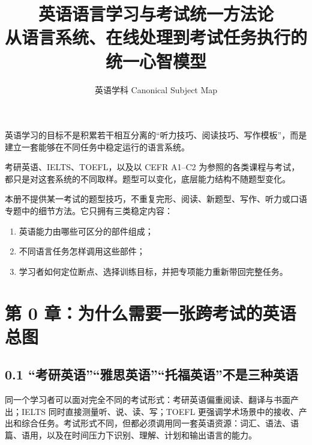 \documentclass[11pt,a4paper]{ctexart}
\title{\vspace{-1.15cm}\textbf{英语语言学习与考试统一方法论}\\[0.35em]
\large 从语言系统、在线处理到考试任务执行的统一心智模型}
\author{英语学科 Canonical Subject Map}
\date{}
\begin{document}
\maketitle

\begin{corebox}[总纲]
英语学习的目标不是积累若干相互分离的“听力技巧、阅读技巧、写作模板”，而是建立一套能够在不同任务中稳定运行的语言系统。
\begin{center}
\end{center}
考研英语、IELTS、TOEFL，以及以 CEFR A1--C2 为参照的各类课程与考试，都只是对这套系统的不同取样。题型可以变化，底层能力结构不随题型变化。
\end{corebox}

\begin{warn}[本册的边界]
本册不提供某一考试的题型技巧，不重复完形、阅读、新题型、写作、听力或口语专题中的细节方法。它只拥有三类稳定内容：
\begin{enumerate}
  \item 英语能力由哪些可区分的部件组成；
  \item 不同语言任务怎样调用这些部件；
  \item 学习者如何定位断点、选择训练目标，并把专项能力重新带回完整任务。
\end{enumerate}
\end{warn}

\tableofcontents
\newpage

\section{第 0 章：为什么需要一张跨考试的英语总图}

\subsection{0.1 “考研英语”“雅思英语”“托福英语”不是三种英语}
同一个学习者可以面对完全不同的考试形式：考研英语偏重阅读、翻译与书面产出；IELTS 同时直接测量听、说、读、写；TOEFL 更强调学术场景中的接收、产出和综合任务。考试形式不同，但都必须调用同一套英语资源：词汇、语法、语篇、语用，以及在时间压力下识别、理解、计划和输出语言的能力。
\end{document}
